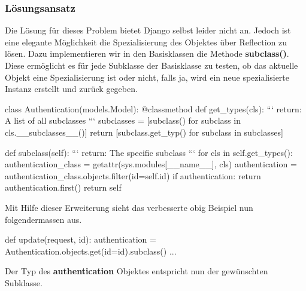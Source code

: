 \subsubsection{Lösungsansatz}
Die Lösung für dieses Problem bietet Django selbst leider nicht an. Jedoch ist eine elegante Möglichkeit die Spezialisierung des Objektes über Reflection zu lösen. Dazu implementieren wir in den Basisklassen die Methode \textbf{subclass()}.\\
Diese ermöglicht es für jede Subklasse der Basisklasse zu testen, ob das aktuelle Objekt eine Spezialisierung ist oder nicht, falls ja, wird ein neue spezialisierte Instanz erstellt und zurück gegeben.
\medskip
\begin{python}
class Authentication(models.Model):
    @classmethod
    def get_types(cls):
        ```
        return: A list of all subclasses
        ```
        subclasses = [subclass() for subclass in cls.__subclasses__()]
        return [subclass.get_typ() for subclass in subclasses]	
	
    def subclass(self):
        ```
        return: The specific subclass 
        ```
        for cls in self.get_types():
            authentication_class = getattr(sys.modules[__name__], cls)
            authentication = authentication_class.objects.filter(id=self.id)
            if authentication:
                return authentication.first()
        return self
\end{python}
\medskip
Mit Hilfe dieser Erweiterung sieht das verbesserte obig Beispiel nun folgendermassen aus.
\medskip
\begin{python}
def update(request, id):
    authentication = Authentication.objects.get(id=id).subclass()
    ...
\end{python}
\medskip
Der Typ des \textbf{authentication} Objektes entspricht nun der gewünschten Subklasse.\\\\


